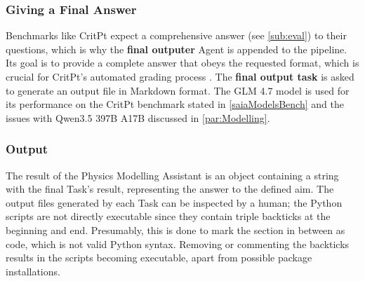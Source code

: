 \documentclass[
	fontsize = 11pt,
	paper = a4,
	draft = false,
	twoside = true,
	titlepage = false
]{scrartcl}
\numberwithin{equation}{subsection}
\begin{document}
	\subsubsection{Giving a Final Answer} \label{subsub:finalAnswer}
	Benchmarks like CritPt expect a comprehensive answer (see \autoref{sub:eval}) to their questions, which is why the \textbf{final outputer} \gls{Agent} is appended to the pipeline. Its goal is to provide a complete answer that obeys the requested format, which is crucial for CritPt's automated grading process \autocite{critPtArx}. The \textbf{final output task} is asked to generate an output file in Markdown format. The GLM 4.7 model is used for its performance on the CritPt benchmark stated in \autoref{saiaModelsBench} and the issues with Qwen3.5 397B A17B discussed in \autoref{par:Modelling}.
	
	\subsubsection{Output} \label{subsub:outputBackticks}
	The result of the Physics Modelling Assistant is an object containing a string with the final Task's result, representing the answer to the defined aim. The output files generated by each Task can be inspected by a human; the Python scripts are not directly executable since they contain triple backticks at the beginning and end. Presumably, this is done to mark the section in between as code, which is not valid Python syntax. Removing or commenting the backticks results in the scripts becoming executable, apart from possible package installations.
	
\end{document}
